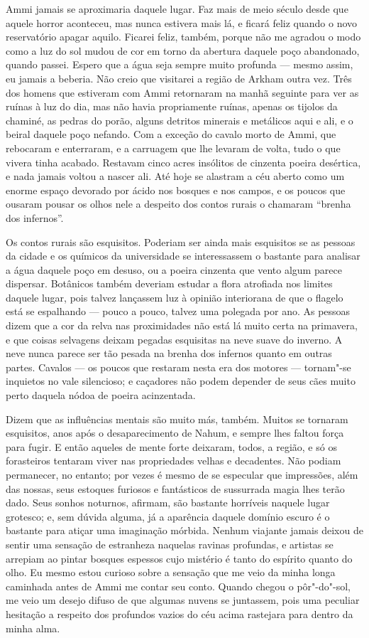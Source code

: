 Ammi jamais se aproximaria daquele lugar. Faz mais de meio século desde
que aquele horror aconteceu, mas nunca estivera mais lá, e ficará feliz
quando o novo reservatório apagar aquilo. Ficarei feliz, também, porque
não me agradou o modo como a luz do sol mudou de cor em torno da
abertura daquele poço abandonado, quando passei. Espero que a água seja
sempre muito profunda --- mesmo assim, eu jamais a beberia. Não creio
que visitarei a região de Arkham outra vez. Três dos homens que
estiveram com Ammi retornaram na manhã seguinte para ver as ruínas à luz
do dia, mas não havia propriamente ruínas, apenas os tijolos da chaminé,
as pedras do porão, alguns detritos minerais e metálicos aqui e ali, e o
beiral daquele poço nefando. Com a exceção do cavalo morto de Ammi, que
rebocaram e enterraram, e a carruagem que lhe levaram de volta, tudo o
que vivera tinha acabado. Restavam cinco acres insólitos de cinzenta
poeira desértica, e nada jamais voltou a nascer ali. Até hoje se
alastram a céu aberto como um enorme espaço devorado por ácido nos
bosques e nos campos, e os poucos que ousaram pousar os olhos nele a
despeito dos contos rurais o chamaram ``brenha dos infernos''.

Os contos rurais são esquisitos. Poderiam ser ainda mais esquisitos se
as pessoas da cidade e os químicos da universidade se interessassem o
bastante para analisar a água daquele poço em desuso, ou a poeira
cinzenta que vento algum parece dispersar. Botânicos também deveriam
estudar a flora atrofiada nos limites daquele lugar, pois talvez
lançassem luz à opinião interiorana de que o flagelo está se
espalhando
--- pouco a pouco, talvez uma
polegada por ano. As pessoas dizem que a cor da relva nas proximidades
não está lá muito certa na primavera, e que coisas selvagens deixam
pegadas esquisitas na neve suave do inverno. A neve nunca parece ser tão
pesada na brenha dos infernos quanto em outras partes. Cavalos --- os
poucos que restaram nesta era dos motores --- tornam"-se inquietos no
vale silencioso; e caçadores não podem depender de seus cães muito perto
daquela nódoa de poeira acinzentada.

Dizem que as influências mentais são muito más, também. Muitos se
tornaram esquisitos, anos após o desaparecimento de Nahum, e sempre lhes
faltou força para fugir. E então aqueles de mente forte deixaram, todos,
a região, e só os forasteiros tentaram viver nas propriedades velhas e
decadentes. Não podiam permanecer, no entanto; por vezes é mesmo de se
especular que impressões, além das nossas, seus estoques furiosos e
fantásticos de sussurrada magia lhes terão dado. Seus sonhos noturnos,
afirmam, são bastante horríveis naquele lugar grotesco; e, sem dúvida
alguma, já a aparência daquele domínio escuro é o bastante para atiçar
uma imaginação mórbida. Nenhum viajante jamais deixou de sentir uma
sensação de estranheza naquelas ravinas profundas, e artistas se
arrepiam ao pintar bosques espessos cujo mistério é tanto do espírito
quanto do olho. Eu mesmo estou curioso sobre a sensação que me veio da
minha longa caminhada antes de Ammi me contar seu conto. Quando chegou o
pôr"-do"-sol, me veio um desejo difuso de que algumas nuvens se juntassem,
pois uma peculiar hesitação a respeito dos profundos vazios do céu acima
rastejara para dentro da minha alma.

